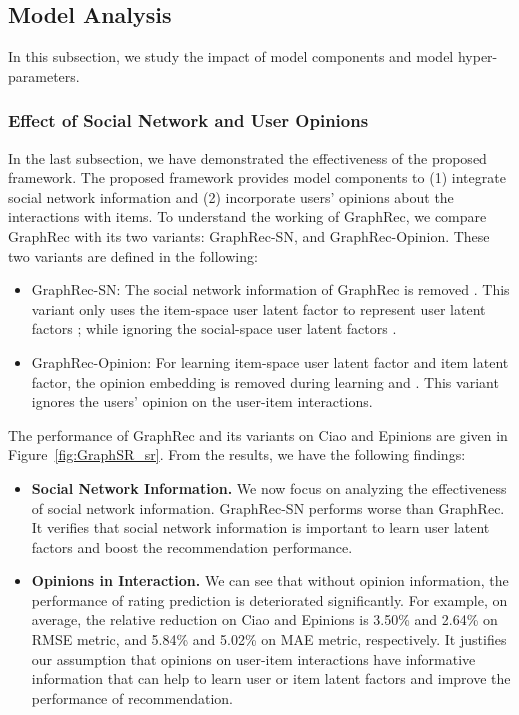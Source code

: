 \documentclass[sigconf]{acmart} \copyrightyear{2019}
\begin{document}
\subsection{Model Analysis}

In this subsection, we study the impact of model components and model hyper-parameters. 

\subsubsection{Effect of Social Network and User Opinions}

In the last subsection, we have demonstrated the effectiveness of the proposed framework. The proposed framework provides model components to (1) integrate social network information  and (2) incorporate users' opinions about the interactions with items. To understand the working of GraphRec, we compare GraphRec with its two variants: GraphRec-SN, and GraphRec-Opinion. These two variants are defined in the following:
\begin{itemize}
  \item GraphRec-SN: The social network information of GraphRec is removed . This variant only uses the item-space user latent factor  to represent user latent factors ; while ignoring the social-space user latent factors .
  \item GraphRec-Opinion: For learning item-space user latent factor and item latent factor, the opinion embedding is removed during learning  and . This variant ignores the users' opinion on the user-item interactions.
\end{itemize}

The performance of GraphRec and its variants on Ciao and Epinions are given in Figure~\ref{fig:GraphSR_sr}. From the results, we have the following findings:
\begin{itemize}
  \item {\bf Social Network Information.} We now focus on analyzing the effectiveness of social network information. GraphRec-SN performs worse than GraphRec. It verifies that social network information is important to learn user latent factors and boost the recommendation performance.
  \item {\bf Opinions in Interaction.} We can see that without opinion information, the performance of rating prediction is deteriorated significantly. For example, on average, the relative reduction on Ciao and Epinions is 3.50\% and 2.64\% on RMSE metric, and 5.84\% and 5.02\% on MAE metric, respectively. It justifies our assumption that opinions on user-item interactions have informative information that can help to learn user or item latent factors and improve the performance of recommendation.
\end{itemize}
\end{document}
